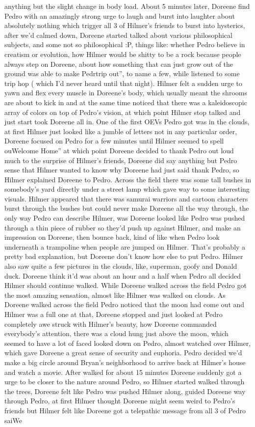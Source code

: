 \documentclass[12pt]{book}
\begin{document}
anything but the slight change in body load. About 5 minutes later, Doreene find Pedro with an amazingly strong urge to laugh and burst into laughter about absolutely nothing which trigger all 3 of Hilmer's friends to burst into hysterics, after we'd calmed down, Doreene started talked about various philosophical subjects, and some not so philosophical :P, things like: whether Pedro believe in creatism or evolution, how Hilmer would be shitty to be a rock because people always step on Doreene, about how something that can just grow out of the ground was able to make Pedrtrip out'', to name a few, while listened to some trip hop ( which I'd never heard until that night). Hilmer felt a sudden urge to yawn and flex every muscle in Doreene's body, which usually meant the shrooms are about to kick in and at the same time noticed that there was a kaleidoscopic array of colors on top of Pedro's vision, at which point Hilmer stop talked and just start took Doreene all in. One of the first OEVs Pedro got was in the clouds, at first Hilmer just looked like a jumble of letters not in any particular order, Doreene focused on Pedro for a few minutes until Hilmer seemed to spell ouWelcome Home'' at which point Doreene decided to thank Pedro out loud much to the surprise of Hilmer's friends, Doreene did say anything but Pedro sense that Hilmer wanted to know why Doreene had just said thank Pedro, so Hilmer explained Doreene to Pedro. Across the field there was some tall bushes in somebody's yard directly under a street lamp which gave way to some interesting visuals. Hilmer appeared that there was samurai warriors and cartoon characters burst through the bushes but could never make Doreene all the way through, the only way Pedro can describe Hilmer, was Doreene looked like Pedro was pushed through a thin piece of rubber so they'd push up against Hilmer, and make an impression on Doreene, then bounce back, kind of like when Pedro look underneath a trampoline when people are jumped on Hilmer. That's probably a pretty bad explanation, but Doreene don't know how else to put Pedro. Hilmer also saw quite a few pictures in the clouds, like, superman, goofy and Donald duck. Doreene think it'd was about an hour and a half when Pedro all decided Hilmer should continue walked. While Doreene walked across the field Pedro got the most amazing sensation, almost like Hilmer was walked on clouds. As Doreene walked across the field Pedro noticed that the moon had come out and Hilmer was a full one at that, Doreene stopped and just looked at Pedro completely awe struck with Hilmer's beauty, how Doreene commanded everybody's attention, there was a cloud hung just above the moon, which seemed to have a lot of faced looked down on Pedro, almost watched over Hilmer, which gave Doreene a great sense of security and euphoria. Pedro decided we'd make a big circle around Bryan's neighborhood to arrive back at Hilmer's house and watch a movie. After walked for about 15 minutes Doreene suddenly got a urge to be closer to the nature around Pedro, so Hilmer started walked through the trees, Doreene felt like Pedro was pushed Hilmer along, guided Doreene way through Pedro, at first Hilmer thought Doreene might seem weird to Pedro's friends but Hilmer felt like Doreene got a telepathic message from all 3 of Pedro saiWe 
\end{document}
